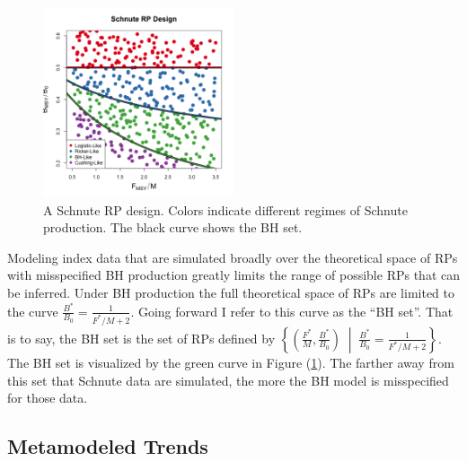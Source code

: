 %
\begin{figure}
\vspace{-0.5cm}
\includegraphics[width=0.5\textwidth]{../ddBias/designLineColorHHardFlatT30N150WWideN112.png}
\vspace{-1cm}
\caption{
A Schnute RP design. %
Colors indicate different regimes of Schnute production. %
The black curve shows the BH set.
}
\label{colorDes}
\end{figure}

%
Modeling index data that are simulated broadly over the theoretical space of RPs
with misspecified BH production greatly limits the range of possible RPs that
can be inferred. Under BH production the full theoretical space of RPs are
limited to the curve \mbox{$\frac{B^*}{B_0}=\frac{1}{F^*/M+2}$.} Going forward I refer to 
this curve as the ``BH set''. That is to say, the BH set is the set of RPs defined by
$\left\{\left(\frac{F^*}{M}, \frac{B^*}{B_0}\right) \;\middle|\; \frac{B^*}{B_0}=\frac{1}{F^*/M+2}\right\}$. 
The BH set is visualized by the green curve in Figure (\ref{colorDes}).
The farther away from this set that Schnute data are simulated, the more the
BH model is misspecified for those data.

%
\subsection{Metamodeled Trends \label{sMeta}}

